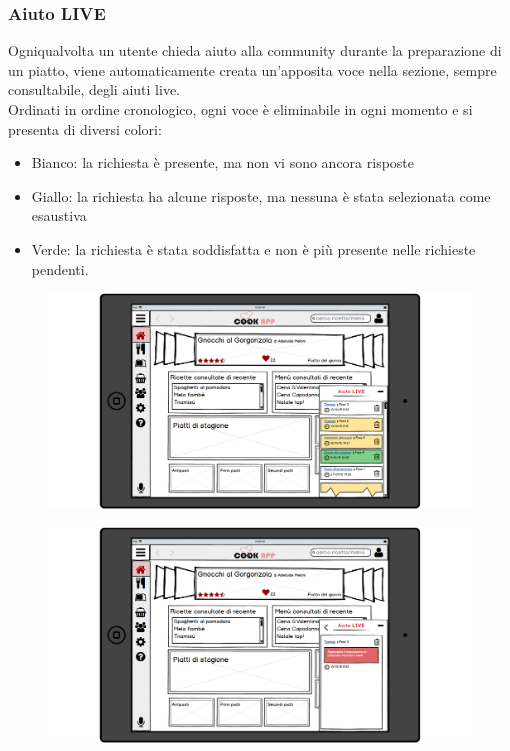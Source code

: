 \subsubsection{Aiuto LIVE}
Ogniqualvolta un utente chieda aiuto alla community durante la preparazione di un piatto, viene automaticamente creata un'apposita voce nella sezione, sempre consultabile, degli aiuti live.\\
Ordinati in ordine cronologico, ogni voce è eliminabile in ogni momento e si presenta di diversi colori:
\begin{itemize}
\item Bianco: la richiesta è presente, ma non vi sono ancora risposte
\item Giallo: la richiesta ha alcune risposte, ma nessuna è stata selezionata come esaustiva
\item Verde: la richiesta è stata soddisfatta e non è più presente nelle richieste pendenti.
\end{itemize}
\begin{figure}[H]
	\centering
	\includegraphics[width=0.95\linewidth]{img/mockup/Live1.png}
\end{figure}
\begin{figure}[H]
	\centering
	\includegraphics[width=0.95\linewidth]{img/mockup/Live2.png}
\end{figure}
